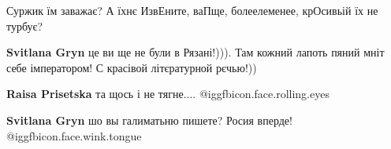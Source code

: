  
Суржик їм заважає? А їхнє ИзвЕните, ваПще, болеелеменее, крОсивьій їх не
турбує?

\begin{itemize} %
 
\textbf{Svitlana Gryn} це ви ще не були в Рязані!))). Там кожний лапоть пяний мніт себе імператором! С красівой літєратурной рєчью!))

 
\textbf{Raisa Prisetska} та щось і не тягне.... @igg{fbicon.face.rolling.eyes} 

 
\textbf{Svitlana Gryn} шо вы галиматьню пишете? Росия вперде! @igg{fbicon.face.wink.tongue} 
\end{itemize} %

